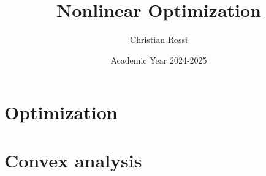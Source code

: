 \documentclass[12pt, a4paper]{report}
\title{\textbf{Nonlinear Optimization}}
\author{Christian Rossi}
\date{Academic Year 2024-2025}
\begin{document}
    \maketitle

    

    \cleardoublepage{}

    \tableofcontents

    \cleardoublepage{}

    \chapter{Optimization}
    
    

    \chapter{Convex analysis}
\end{document}
